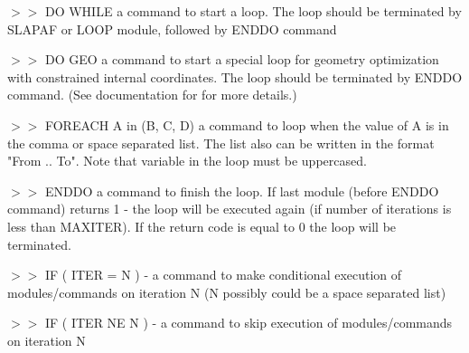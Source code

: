 \begin{commandlist}
\item[$>>$ DO WHILE ]  a command to start a loop. The loop should be terminated by SLAPAF or LOOP module,
followed by ENDDO command
\item[$>>$ DO GEO ]  a command to start a special loop for geometry optimization
with constrained internal coordinates. The loop should be terminated by
 ENDDO command. (See documentation for  for more details.)
\item[$>>$ FOREACH A in (B, C, D) ]  a command to loop when the value of A is in the comma or space separated list.
The list also can be written in the format "From .. To". Note that variable in the loop must be uppercased.
\item[$>>$ ENDDO ] a command to finish the loop. If last module (before ENDDO command) returns
1 - the loop will be executed again (if number of iterations is less than MAXITER).
If the return code is equal to 0 the loop will be terminated.
\item[$>>$ IF ( ITER = N ) ]  - a command to make conditional execution of modules/commands on iteration N (N possibly could be a space separated list)
\item[$>>$ IF ( ITER NE N ) ] - a command to skip execution of modules/commands on iteration N

\end{commandlist}
